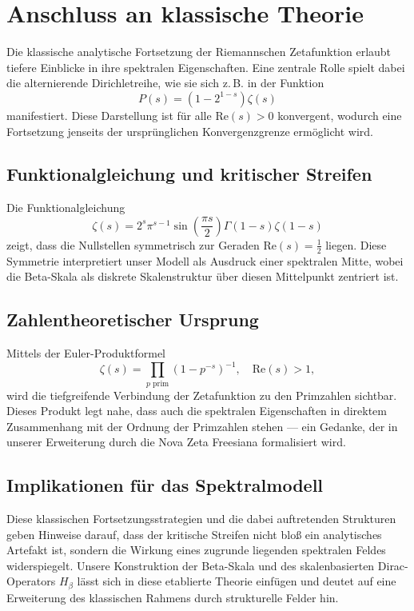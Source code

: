 \documentclass[12pt]{article}
\begin{document}
\section{Anschluss an klassische Theorie}

Die klassische analytische Fortsetzung der Riemannschen Zetafunktion erlaubt tiefere Einblicke in ihre spektralen Eigenschaften. Eine zentrale Rolle spielt dabei die alternierende Dirichletreihe, wie sie sich z.\,B. in der Funktion
\[
P(s) = (1 - 2^{1-s})\zeta(s)
\]
manifestiert. Diese Darstellung ist für alle \( \text{Re}(s) > 0 \) konvergent, wodurch eine Fortsetzung jenseits der ursprünglichen Konvergenzgrenze ermöglicht wird.

\subsection{Funktionalgleichung und kritischer Streifen}

Die Funktionalgleichung
\[
\zeta(s) = 2^s \pi^{s-1} \sin\left( \frac{\pi s}{2} \right) \Gamma(1-s)\zeta(1-s)
\]
zeigt, dass die Nullstellen symmetrisch zur Geraden \( \text{Re}(s) = \frac{1}{2} \) liegen. Diese Symmetrie interpretiert unser Modell als Ausdruck einer spektralen Mitte, wobei die Beta-Skala als diskrete Skalenstruktur über diesen Mittelpunkt zentriert ist.

\subsection{Zahlentheoretischer Ursprung}

Mittels der Euler-Produktformel
\[
\zeta(s) = \prod_{p \text{ prim}} \left(1 - p^{-s}\right)^{-1}, \quad \text{Re}(s) > 1,
\]
wird die tiefgreifende Verbindung der Zetafunktion zu den Primzahlen sichtbar. Dieses Produkt legt nahe, dass auch die spektralen Eigenschaften in direktem Zusammenhang mit der Ordnung der Primzahlen stehen — ein Gedanke, der in unserer Erweiterung durch die Nova Zeta Freesiana formalisiert wird.

\subsection{Implikationen für das Spektralmodell}

Diese klassischen Fortsetzungsstrategien und die dabei auftretenden Strukturen geben Hinweise darauf, dass der kritische Streifen nicht bloß ein analytisches Artefakt ist, sondern die Wirkung eines zugrunde liegenden spektralen Feldes widerspiegelt. Unsere Konstruktion der Beta-Skala und des skalenbasierten Dirac-Operators \( H_\beta \) lässt sich in diese etablierte Theorie einfügen und deutet auf eine Erweiterung des klassischen Rahmens durch strukturelle Felder hin.
\end{document}
